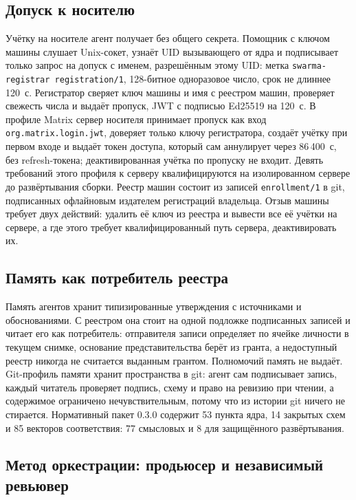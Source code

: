\documentclass[10pt,a4paper]{article}
\begin{document}
\subsection{Допуск к носителю}
\label{sec:carrier}

Учётку на носителе агент получает без общего секрета. Помощник с ключом машины слушает Unix-сокет, узнаёт UID вызывающего от ядра и подписывает только запрос на допуск с именем, разрешённым этому UID: метка \texttt{swarma-registrar registration/1}, 128-битное одноразовое число, срок не длиннее 120~с. Регистратор сверяет ключ машины и имя с реестром машин, проверяет свежесть числа и выдаёт пропуск, JWT с подписью Ed25519 на 120~с. В профиле Matrix сервер носителя принимает пропуск как вход \texttt{org.matrix.login.jwt}, доверяет только ключу регистратора, создаёт учётку при первом входе и выдаёт токен доступа, который сам аннулирует через 86\,400~с, без refresh-токена; деактивированная учётка по пропуску не входит. Девять требований этого профиля к серверу квалифицируются на изолированном сервере до развёртывания сборки. Реестр машин состоит из записей \texttt{enrollment/1} в git, подписанных офлайновым издателем регистраций владельца. Отзыв машины требует двух действий: удалить её ключ из реестра и вывести все её учётки на сервере, а где этого требует квалифицированный путь сервера, деактивировать их.

\subsection{Память как потребитель реестра}
\label{sec:memory}

Память агентов хранит типизированные утверждения с источниками и обоснованиями. С реестром она стоит на одной подложке подписанных записей и читает его как потребитель: отправителя записи определяет по ячейке личности в текущем снимке, основание представительства берёт из гранта, а недоступный реестр никогда не считается выданным грантом. Полномочий память не выдаёт. Git-профиль памяти хранит пространства в git: агент сам подписывает запись, каждый читатель проверяет подпись, схему и право на ревизию при чтении, а содержимое ограничено нечувствительным, потому что из истории git ничего не стирается. Нормативный пакет 0.3.0 содержит 53 пункта ядра, 14 закрытых схем и 85 векторов соответствия: 77 смысловых и 8 для защищённого развёртывания.

\subsection{Метод оркестрации: продьюсер и независимый ревьювер}
\label{sec:review}
\end{document}
